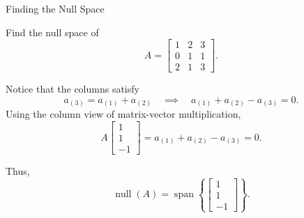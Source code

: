 \documentclass[10pt]{beamer}
\begin{document}
\begin{frame}{Finding the Null Space}


\begin{example}
Find the null space of
\[
A=
\begin{bmatrix}
1&2&3\\
0&1&1\\
2&1&3
\end{bmatrix}.
\]

\end{example}
Notice that the columns satisfy
\[
    a_{(3)}=a_{(1)}+a_{(2)} \quad \implies \quad  a_{(1)}+a_{(2)}-a_{(3)}=0.
\]
Using the column view of matrix-vector multiplication,
\[
A
\begin{bmatrix}
1\\
1\\
-1
\end{bmatrix}
=
a_{(1)}+a_{(2)}-a_{(3)}
=0.
\]

Thus,
\[
\operatorname{null}(A)
=
\operatorname{span}
\left\{
\begin{bmatrix}
1\\
1\\
-1
\end{bmatrix}
\right\}.
\]

\end{frame}


\end{document}
